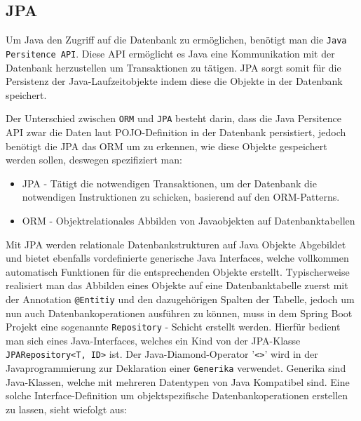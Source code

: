 \documentclass[paper=a4,12pt]{scrreprt}
\begin{document}
\subsection{JPA}

Um Java den Zugriff auf die Datenbank zu ermöglichen, benötigt man die \texttt{Java Persitence API}\cite{spring_jpa}. Diese API ermöglicht es Java eine Kommunikation mit der Datenbank herzustellen um Transaktionen zu tätigen.\newline
JPA sorgt somit für die Persistenz der Java-Laufzeitobjekte indem diese die Objekte in der Datenbank speichert.\newline

Der Unterschied zwischen \texttt{ORM} und \texttt{JPA} besteht darin, dass die Java Persitence API zwar die Daten laut POJO-Definition in der Datenbank persistiert, jedoch benötigt die JPA das ORM um zu erkennen, wie diese Objekte gespeichert werden sollen, deswegen spezifiziert man:\newline
\begin{itemize}
  \item JPA - Tätigt die notwendigen Transaktionen, um der Datenbank die notwendigen Instruktionen zu schicken, basierend auf den ORM-Patterns.
  \item ORM - Objektrelationales Abbilden von Javaobjekten auf Datenbanktabellen
\end{itemize}

Mit JPA werden relationale Datenbankstrukturen auf Java Objekte Abgebildet und bietet ebenfalls vordefinierte generische Java Interfaces, welche vollkommen automatisch Funktionen für die entsprechenden Objekte erstellt. Typischerweise
realisiert man das Abbilden eines Objekte auf eine Datenbanktabelle zuerst mit der Annotation \texttt{@Entitiy} und den dazugehörigen Spalten der Tabelle, jedoch um nun auch Datenbankoperationen ausführen zu können, muss in dem Spring Boot Projekt eine
sogenannte \texttt{Repository} - Schicht erstellt werden.\newline
Hierfür bedient man sich eines Java-Interfaces, welches ein Kind von der JPA-Klasse \texttt{JPARepository<T, ID>} ist. Der Java-Diamond-Operator '\texttt{<>}' wird in der Javaprogrammierung zur Deklaration einer \texttt{Generika} verwendet. Generika sind Java-Klassen,
welche mit mehreren Datentypen von Java Kompatibel sind.\newline
Eine solche Interface-Definition um objektspezifische Datenbankoperationen erstellen zu lassen, sieht wiefolgt aus:\newline
\end{document}
